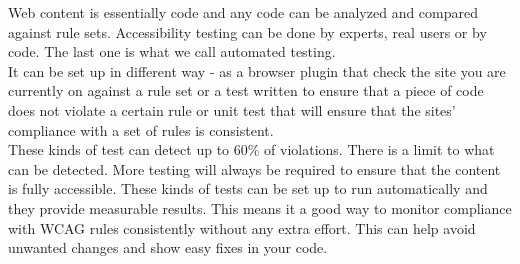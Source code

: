 \documentclass{master_thesis_section}
\begin{document}
Web content is essentially code and any code can be analyzed and compared against rule sets. Accessibility testing can be done by experts, real users or by code. The last one is what we call automated testing. \\
It can be set up in different way - as a browser plugin that check the site you are currently on against a rule set or a test written to ensure that a piece of code does not violate a certain rule or unit test that will ensure that the sites' compliance with a set of rules is consistent. \\
These kinds of test can detect up to 60\% of violations. There is a limit to what can be detected. More testing will always be required to ensure that the content is fully accessible. These kinds of tests can be set up to run automatically and they provide measurable results. This means it a good way to monitor compliance with WCAG rules consistently without any extra effort. This can help avoid unwanted changes and show easy fixes in  your code.
\end{document}
